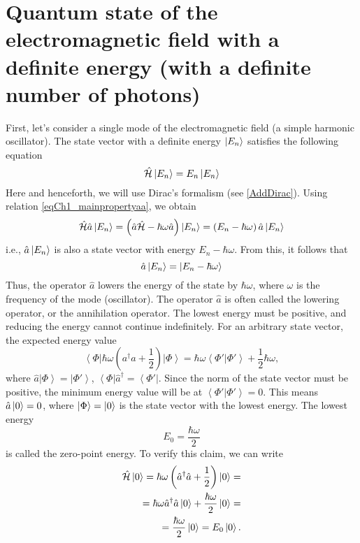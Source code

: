 \section{Quantum state of the electromagnetic field with a definite energy (with a definite number of photons)}

First, let's consider a single mode of the electromagnetic field (a simple harmonic oscillator). The state vector with a definite energy $\ket{E_n}$ satisfies the following equation
\begin{equation}
\hat{\mathcal{H}} \ket{E_n} = E_n \ket{E_n}
\end{equation}
Here and henceforth, we will use Dirac's formalism (see \autoref{AddDirac}). Using relation \eqref{eqCh1_mainpropertyaa}, we obtain
\begin{equation}
\hat{\mathcal{H}} \hat{a}\ket{E_n} = 
\left(\hat{a}\hat{\mathcal{H}} -
\hbar\omega\hat{a}\right)\ket{E_n} =
\left(E_n - \hbar \omega\right)\hat{a}\ket{E_n}
\end{equation}
i.e., $\hat{a}\ket{E_n}$ is also a state vector with energy $E_n - \hbar \omega$. From this, it follows that
\[
\hat{a}\ket{E_n} = \left|E_n - \hbar \omega \right>
\] 
Thus, the operator $\hat{a}$ lowers the energy of the state by $\hbar \omega$, where $\omega$ is the frequency of the mode (oscillator). The operator $\hat{a}$ is often called the lowering operator, or the annihilation operator. The lowest energy must be positive, and reducing the energy cannot continue indefinitely. For an arbitrary state vector, the expected energy value
\begin{equation}
\left< \Phi \right| \hbar \omega \left({a}^{\dag} {a}  +
\frac{1}{2}\right)\left| \Phi \right> = 
\hbar \omega \left< \Phi' \right. \left| \Phi' \right> + \frac{1}{2}
\hbar \omega,
\end{equation}
where $\hat{a} \left| \Phi \right> = \left| \Phi' \right>$,  
$\left< \Phi \right| \hat{a}^{\dag}  = \left< \Phi' \right|$. Since the norm of the state vector must be positive, the minimum energy value will be at
\(
\left< \Phi' \right. \left| \Phi' \right> = 0.
\)
This means $\hat{a}\ket{0} = 0$, where $\left|\Phi\right> = \ket{0}$ is the state vector with the lowest energy. The lowest energy
\begin{equation}
E_0 = \frac{\hbar \omega}{2}
\end{equation}
is called the zero-point energy. To verify this claim, we can write
\begin{eqnarray}
\hat{\mathcal{H}} \ket{0} = 
\hbar \omega \left(\hat{a}^{\dag} \hat{a} +
\frac{1}{2}\right) \ket{0} = 
\nonumber \\
= 
\hbar \omega \hat{a}^{\dag} \hat{a} \ket{0} +
\frac{\hbar \omega}{2}\ket{0} =
\nonumber \\
= \frac{\hbar \omega}{2} \ket{0} = 
E_0 \ket{0}.
\label{eqProper0state}
\end{eqnarray}

